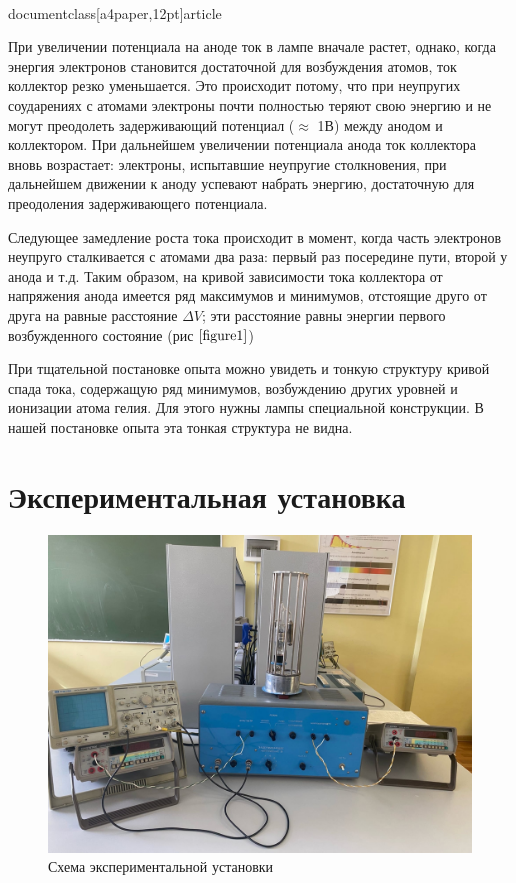\\documentclass[a4paper,12pt]{article}
\begin{document}
При увеличении потенциала на аноде ток в лампе вначале растет, однако, когда энергия электронов становится достаточной для возбуждения атомов, ток коллектор резко уменьшается. Это происходит потому, что при неупругих соударениях с атомами электроны почти полностью теряют свою энергию и не могут преодолеть задерживающий потенциал ($\approx$ 1В) между анодом и коллектором. При дальнейшем увеличении потенциала анода ток коллектора вновь возрастает: электроны, испытавшие неупругие столкновения, при дальнейшем движении к аноду успевают набрать энергию, достаточную для преодоления задерживающего потенциала.

Следующее замедление роста тока происходит в момент, когда часть электронов неупруго сталкивается с атомами два раза: первый раз посередине пути, второй у анода  и т.д. Таким образом, на кривой зависимости тока коллектора от напряжения анода имеется ряд максимумов и минимумов, отстоящие друго от друга на равные расстояние $\Delta V$; эти расстояние равны энергии первого возбужденного состояние (рис $\ref{figure1}$)

При тщательной постановке опыта можно увидеть и тонкую структуру кривой спада тока, содержащую ряд минимумов, возбуждению других уровней и ионизации атома гелия. Для этого нужны лампы специальной конструкции. В нашей постановке опыта эта тонкая структура не видна.

\newpage

\section*{Экспериментальная установка}

\begin{figure}[h]
    \centering
    \includegraphics[width=15cm]{fig3}
    \caption{Схема экспериментальной установки}
    \label{fig:vac}
\end{figure}
\end{document}
